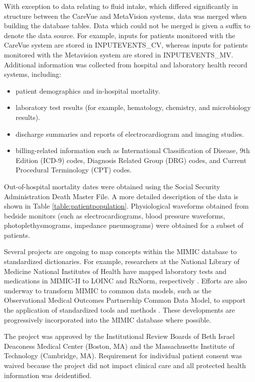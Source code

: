 \documentclass[english]{article}
\begin{document}
With exception to data relating to fluid intake, which differed significantly in structure between the CareVue and MetaVision systems, data was merged when building the database tables. Data which could not be merged is given a suffix to denote the data source. For example, inputs for patients monitored with the CareVue system are stored in INPUTEVENTS\_CV, whereas inputs for patients monitored with the Metavision system are stored in INPUTEVENTS\_MV. Additional information was collected from hospital and laboratory health record systems, including:
\begin{itemize}
  \item patient demographics and in-hospital mortality.
  \item laboratory test results (for example, hematology, chemistry, and microbiology results).
  \item discharge summaries and reports of electrocardiogram and imaging studies.
  \item billing-related information such as International Classification of Disease, 9th Edition (ICD-9) codes, Diagnosis Related Group (DRG) codes, and Current Procedural Terminology (CPT) codes.
\end{itemize}
Out-of-hospital mortality dates were obtained using the Social Security Administration Death Master File. A more detailed description of the data is shown in Table \ref{table:patientpopulation}. Physiological waveforms obtained from bedside monitors (such as electrocardiograms, blood pressure waveforms, photoplethysmograms, impedance pneumograms) were obtained for a subset of patients. 

Several projects are ongoing to map concepts within the MIMIC database to standardized dictionaries. For example, researchers at the National Library of Medicine National Institutes of Health have mapped laboratory tests and medications in MIMIC-II to LOINC and RxNorm, respectively \cite{abhyankar2012}. Efforts are also underway to transform MIMIC to common data models, such as the Observational Medical Outcomes Partnership Common Data Model, to support the application of standardized tools and methods \cite{cite8}. These developments are progressively incorporated into the MIMIC database where possible.

The project was approved by the Institutional Review Boards of Beth Israel Deaconess Medical Center (Boston, MA) and the Massachusetts Institute of Technology (Cambridge, MA). Requirement for individual patient consent was waived because the project did not impact clinical care and all protected health information was deidentified.
\end{document}
